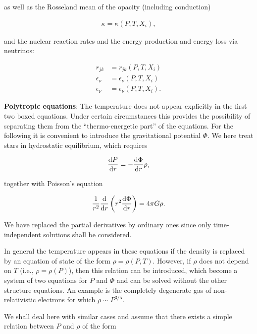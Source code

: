\documentclass[a4paper,10pt]{article}
\begin{document}
{\noindent}as well as the Rosseland mean of the opacity (including conduction)

\begin{align*}
    \kappa = \kappa (P,T,X_i),
\end{align*}

{\noindent}and the nuclear reaction rates and the energy production and energy loss via neutrinos:

\begin{align*}
    r_{jk} &= r_{jk} (P,T,X_i) \\
    \epsilon_\nu &= \epsilon_\nu (P,T,X_i) \\
    \epsilon_\nu &= \epsilon_\nu (P,T,X_i).
\end{align*}

{\noindent}\textbf{Polytropic equations}: The temperature does not appear explicitly in the first two boxed equations. Under certain circumstances this provides the possibility of separating them from the ``thermo-energetic part'' of the equations. For the following it is convenient to introduce the gravitational potential $\Phi$. We here treat stars in hydrostatic equilibrium, which requires

\begin{align*}
    \frac{{\rm d}P}{{\rm d}r} = - \frac{{\rm d}\Phi}{{\rm d}r} \rho,
\end{align*}

{\noindent}together with Poisson's equation

\begin{align*}
    \frac{1}{r^2}\frac{{\rm d}}{{\rm d}r} \left(r^2\frac{{\rm d}\Phi}{{\rm d}r}\right) = 4\pi G\rho.
\end{align*}

{\noindent}We have replaced the partial derivatives by ordinary ones since only time-independent solutions shall be considered.

{\noindent}In general the temperature appears in these equations if the density is replaced by an equation of state of the form $\rho=\rho(P,T)$. However, if $\rho$ does not depend on $T$ (i.e., $\rho=\rho(P)$), then this relation can be introduced, which become a system of two equations for $P$ and $\Phi$ and can be solved without the other structure equations. An example is the completely degenerate gas of non-relativistic electrons for which $\rho\sim P^{3/5}$.

{\noindent}We shall deal here with similar cases and assume that there exists a simple relation between $P$ and $\rho$ of the form
\end{document}
